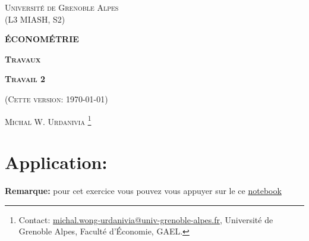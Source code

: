 \documentclass[10pt, reqno]{amsart}
\begin{document}
 
\usetikzlibrary{positioning}
\usetikzlibrary{snakes}
\usetikzlibrary{calc}
\usetikzlibrary{arrows}
\usetikzlibrary{decorations.markings}
\usetikzlibrary{shapes.misc}
\usetikzlibrary{shapes}

%

\begin{titlepage}
\centering
	{\scshape\Large \textsc{Université de Grenoble Alpes\\(L3 MIASH, S2)}\par}
	\vspace{0.5cm}
	{\Large\bfseries \scshape\Large \textsc{ÉCONOMÉTRIE}\par}
	\vspace{0.5cm}
	{\Large\bfseries \textsc{Travaux} \par}
    \vspace{0.5cm}   
   {\Large\bfseries \textsc{Travail 2} \par}
	\vspace{1cm}
	{(\textsc{Cette version: \today})\par}
	\vspace{1cm}
	{\large \textsc{Michal W. Urdanivia}
	\footnote{Contact:  
	\href{mailto:michal.wong-urdanivia@univ-grenoble-alpes.fr}{michal.wong-urdanivia@univ-grenoble-alpes.fr}, 
	 Université de Grenoble Alpes,  Faculté d'\'Economie, GAEL.}\par}
	
\end{titlepage}


\newpage

\tableofcontents

\newpage

\section{Application: \cite{KielMcCain1995}}
\textbf{Remarque:} pour cet exercice vous pouvez vous appuyer sur le ce \href{https://colab.research.google.com/drive/1nSdzN7uEE7603NPnGeRasRqOW8-m09zl?usp=sharing}{notebook} 
\end{document}
